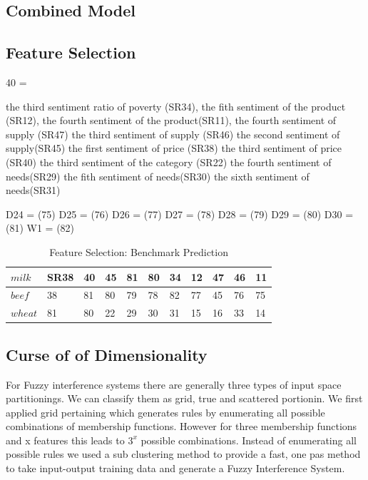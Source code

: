 \subsection{Combined Model}


\subsection{Feature Selection}

	
40 = 


the third sentiment ratio of poverty (SR34), 
the fith sentiment of the product (SR12), 
the fourth sentiment of the product(SR11), 
the fourth sentiment of supply (SR47)
the third sentiment of supply (SR46)
the second sentiment of supply(SR45)
the first sentiment of price (SR38)
the third sentiment of price (SR40)
the third sentiment of the category (SR22)
the fourth sentiment of needs(SR29)
the fith sentiment of needs(SR30)
the sixth sentiment of needs(SR31)


D24 = (75)
D25 = (76)
D26 = (77)
D27 = (78)
D28 = (79)
D29 = (80)
D30 = (81)
W1 = (82)





\begin{table}[H]
\centering
\begin{tabular}{ |p{2cm}|p{1cm}|p{1cm}|p{1cm}|p{1cm}|p{1cm}|p{1cm}|p{1cm}|p{1cm}|p{1cm}| p{1cm}|  }
\hline
$milk$ & SR38 & 40 & 45 & 81 & 80 &  34 & 12 & 47 & 46 & 11 \\
\hline
$beef$ & 38 & 81 & 80 & 79 & 78 &  82 & 77 & 45 &  76 & 75 \\
\hline
$wheat$ & 81 & 80 & 22 & 29 & 30 & 31 & 15 & 16 & 33 & 14 \\
\hline
\end{tabular}
\caption{Feature Selection: Benchmark Prediction}
\label{tab:feat_mod3}
\end{table}









\subsection{Curse of of Dimensionality}

For Fuzzy interference systems there are generally three types of input space partitionings. We can classify them as grid, true and scattered portionin. We first applied grid pertaining which generates rules by enumerating all possible combinations of membership functions. However for three membership functions and x features this leads to $3^x$ possible combinations. Instead of enumerating all possible rules we used a sub clustering method to provide a fast, one pas method to take input-output training data and generate a Fuzzy Interference System. 






